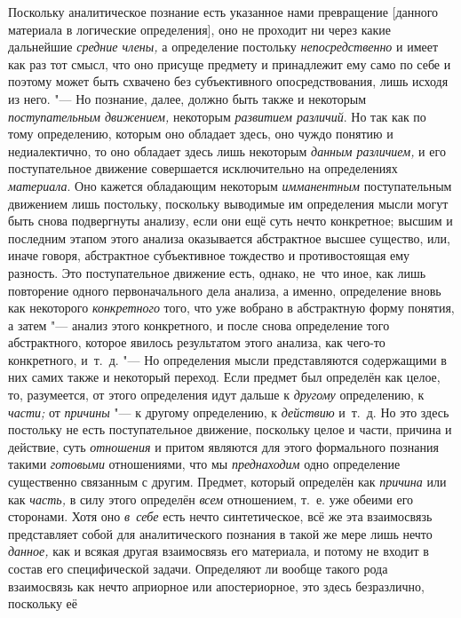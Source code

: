 Поскольку аналитическое познание есть указанное нами
превращение [данного материала в логические определения], оно не проходит
ни через какие дальнейшие {\em средние
члены,} а определение постольку
{\em непосредственно} и
имеет как раз тот смысл, что оно присуще предмету и принадлежит ему само по
себе и поэтому может быть схвачено без субъективного опосредствования, лишь
исходя из него. "--- Но познание, далее, должно быть также и
некоторым {\em поступательным
движением,} некоторым
{\em развитием различий}.
Но так как по тому определению, которым оно обладает здесь,
оно чуждо понятию и недиалектично, то оно обладает здесь лишь некоторым
{\em данным различием,} и
его поступательное движение совершается исключительно на определениях
{\em материала}. Оно
кажется обладающим некоторым
{\em имманентным}
поступательным движением лишь постольку, поскольку выводимые
им определения мысли могут быть снова подвергнуты анализу, если они ещё
суть нечто конкретное; высшим и последним этапом этого анализа оказывается
абстрактное высшее существо, или, иначе говоря, абстрактное субъективное
тождество и противостоящая ему разность. Это поступательное движение есть,
однако, не~что иное, как лишь повторение одного первоначального дела
анализа, а именно, определение вновь как некоторого
{\em конкретного} того,
что уже вобрано в абстрактную форму понятия, а затем
"--- анализ этого конкретного, и после снова определение того
абстрактного, которое явилось результатом этого анализа, как чего-то
конкретного, и~т.~д. "--- Но определения мысли
представляются содержащими в них самих также и некоторый
переход. Если предмет был определён как целое, то, разумеется, от этого
определения идут дальше к {\em другому}
определению, к
{\em части;} от
{\em причины} "--- к другому
определению, к {\em действию}
и~т.~д. Но это здесь постольку не есть поступательное
движение, поскольку целое и части, причина и действие, суть
{\em отношения} и притом
являются для этого формального познания такими
{\em готовыми}
отношениями, что мы
{\em преднаходим} одно
определение существенно связанным с другим. Предмет, который определён как
{\em причина} или как
{\em часть,} в силу этого
определён {\em всем}
отношением, т.~е. уже обеими его сторонами. Хотя оно
{\em в~себе} есть нечто
синтетическое, всё же эта взаимосвязь представляет собой для аналитического
познания в такой же мере лишь нечто
{\em данное,} как и
всякая другая взаимосвязь его материала, и потому не входит в состав его
специфической задачи. Определяют ли вообще такого рода взаимосвязь как
нечто априорное или апостериорное, это здесь безразлично, поскольку её
